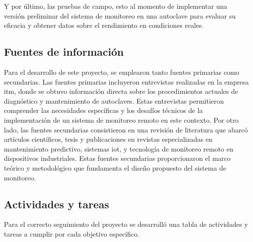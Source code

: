 Y por último, las pruebas de campo, esto al momento de implementar una versión preliminar del sistema de monitoreo en una autoclave para evaluar su eficacia y obtener datos sobre el rendimiento en condiciones reales.

\subsection{Fuentes de información}
Para el desarrollo de este proyecto, se emplearon tanto fuentes primarias como secundarias. Las fuentes primarias incluyeron entrevistas realizadas en la empresa \acrshort{itm}, donde se obtuvo información directa sobre los procedimientos actuales de diagnóstico y mantenimiento de autoclaves. Estas entrevistas permitieron comprender las necesidades específicas y los desafíos técnicos de la implementación de un sistema de monitoreo remoto en este contexto. Por otro lado, las fuentes secundarias consistieron en una revisión de literatura que abarcó artículos científicos, tesis y publicaciones en revistas especializadas en mantenimiento predictivo, sistemas \acrshort{iot}, y tecnología de monitoreo remoto en dispositivos industriales. Estas fuentes secundarias proporcionaron el marco teórico y metodológico que fundamenta el diseño propuesto del sistema de monitoreo.

\subsection{Actividades y tareas}
Para el correcto seguimiento del proyecto se desarrolló una tabla de actividades y tareas a cumplir por cada objetivo específico.

